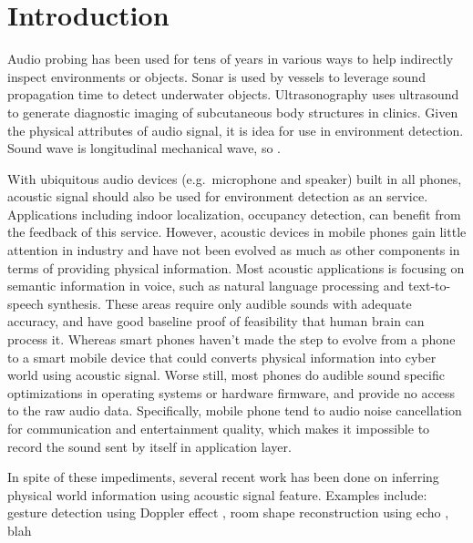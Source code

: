 \section{Introduction}
\label{sec:intro}

Audio probing has been used for tens of years in various ways to help indirectly
inspect environments or objects. Sonar is used by vessels to leverage sound propagation 
time to detect underwater objects. Ultrasonography uses ultrasound to generate
diagnostic imaging of subcutaneous body structures in clinics. 
Given the physical attributes of audio signal, it is idea for use in environment detection.
Sound wave is longitudinal mechanical wave, so . 


With ubiquitous audio devices (e.g.\ microphone and speaker) built in all phones, 
acoustic signal should also be used for 
environment detection as an service. Applications including indoor localization, occupancy detection,
can benefit from the feedback of this service.
However, acoustic devices in mobile phones gain little attention in 
industry and have not been evolved as much as other components \cite{invensense, applem7} 
in terms of providing physical information.
Most acoustic applications is focusing on semantic information in voice, such as natural 
language processing and text-to-speech synthesis. These areas require only audible
sounds with adequate 
accuracy, and have good baseline proof of feasibility that human brain can process it. 
\cite{nirjon2013auditeur}
Whereas smart phones haven't made the step to evolve from a phone to a smart 
mobile device that could converts physical information into cyber world using acoustic signal. 
Worse still, most phones do audible sound specific optimizations in operating systems or 
hardware firmware, and provide no access to the raw audio data. Specifically, mobile phone
tend to audio noise cancellation for communication and entertainment quality, which makes 
it impossible to record the sound sent by itself in application layer.


In spite of these impediments, several recent work has been done on inferring physical world 
information using acoustic signal feature. Examples include: gesture detection using Doppler effect
\cite{gupta2012soundwave, sun2013spartacus}, room shape reconstruction using echo \cite{dokmanic2013acoustic}, 
blah



